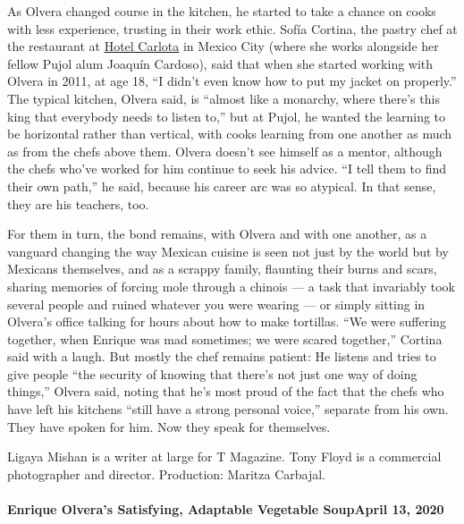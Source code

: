 As Olvera changed course in the kitchen, he started to take a chance on
cooks with less experience, trusting in their work ethic. Sofía Cortina,
the pastry chef at the restaurant at
\href{https://hotelcarlota.mx/}{Hotel Carlota} in Mexico City (where she
works alongside her fellow Pujol alum Joaquín Cardoso), said that when
she started working with Olvera in 2011, at age 18, ``I didn't even know
how to put my jacket on properly.'' The typical kitchen, Olvera said, is
``almost like a monarchy, where there's this king that everybody needs
to listen to,'' but at Pujol, he wanted the learning to be horizontal
rather than vertical, with cooks learning from one another as much as
from the chefs above them. Olvera doesn't see himself as a mentor,
although the chefs who've worked for him continue to seek his advice.
``I tell them to find their own path,'' he said, because his career arc
was so atypical. In that sense, they are his teachers, too.

For them in turn, the bond remains, with Olvera and with one another, as
a vanguard changing the way Mexican cuisine is seen not just by the
world but by Mexicans themselves, and as a scrappy family, flaunting
their burns and scars, sharing memories of forcing mole through a
chinois --- a task that invariably took several people and ruined
whatever you were wearing --- or simply sitting in Olvera's office
talking for hours about how to make tortillas. ``We were suffering
together, when Enrique was mad sometimes; we were scared together,''
Cortina said with a laugh. But mostly the chef remains patient: He
listens and tries to give people ``the security of knowing that there's
not just one way of doing things,'' Olvera said, noting that he's most
proud of the fact that the chefs who have left his kitchens ``still have
a strong personal voice,'' separate from his own. They have spoken for
him. Now they speak for themselves.

Ligaya Mishan is a writer at large for T Magazine. Tony Floyd is a
commercial photographer and director. Production: Maritza Carbajal.

\href{https://www.nytimes.com/2020/04/13/t-magazine/enrique-olvera-vegetable-soup-recipe.html}{}

\hypertarget{enrique-olveras-satisfying-adaptable-vegetable-soupapril-13-2020}{%
\paragraph{Enrique Olvera's Satisfying, Adaptable Vegetable SoupApril
13,
2020}\label{enrique-olveras-satisfying-adaptable-vegetable-soupapril-13-2020}}

